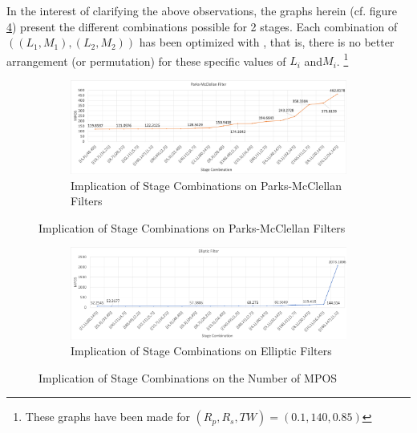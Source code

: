 In the interest of clarifying the above observations, the graphs herein (cf. figure \ref{Figure 3.22}) present the different combinations possible for 2 stages. Each combination of $((L_1,M_1), (L_2,M_2))$ has been optimized with \MATLAB, that is, there is no better arrangement (or permutation) for these specific values of $L_i$ and$ M_i$. \footnote{These graphs have been made for $(R_p, R_s, TW) = (0.1, 140, 0.85)$}

\vspace*{1cm}

\begin{figure}[htb!]	
	\centering
	\begin{subfigure}[b]{\textwidth}
		\centering
		\centerline{\includegraphics[scale=0.25]{2_stages_PM.png}}
		\caption{Implication of Stage Combinations on Parks-McClellan Filters}\label{Figure 22.a}
	\end{subfigure}
	\par\bigskip
\end{figure}

\begin{figure} [ht!]\ContinuedFloat
	\centering
	\begin{subfigure}[b]{\textwidth}
		\centering
		\centerline{\includegraphics[scale=0.25]{2_stages_ellip.png}}
		\caption{Implication of Stage Combinations on Elliptic Filters}
		\label{Figure 22.b}
	\end{subfigure}
\captionsetup{width=0.95\linewidth}%
\caption{Implication of Stage Combinations on the Number of MPOS}\label{Figure 3.22}
\end{figure}

